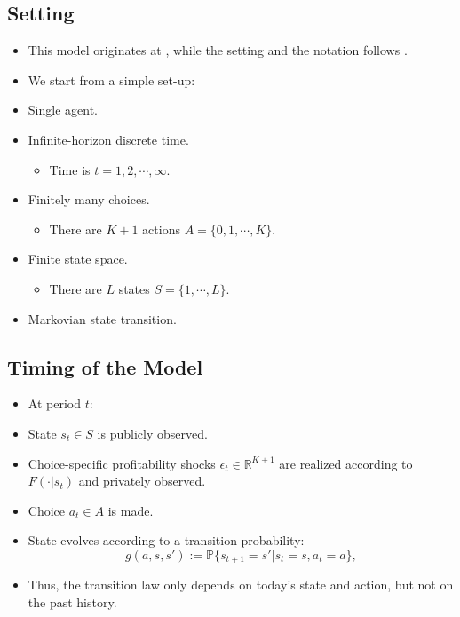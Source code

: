 \documentclass[
]{book}
\providecommand{\tightlist}{%
  \setlength{\itemsep}{0pt}\setlength{\parskip}{0pt}}
\begin{document}
\hypertarget{setting}{%
\subsection{Setting}\label{setting}}

\begin{itemize}
\tightlist
\item
  This model originates at \citet{rustOptimalReplacementGMC1987}, while the setting and the notation follows \citet{pesendorferAsymptoticLeastSquares2008}.
\item
  We start from a simple set-up:
\item
  Single agent.
\item
  Infinite-horizon discrete time.

  \begin{itemize}
  \tightlist
  \item
    Time is \(t = 1, 2, \cdots, \infty\).
  \end{itemize}
\item
  Finitely many choices.

  \begin{itemize}
  \tightlist
  \item
    There are \(K + 1\) actions \(A = \{0, 1, \cdots, K\}\).
  \end{itemize}
\item
  Finite state space.

  \begin{itemize}
  \tightlist
  \item
    There are \(L\) states \(S = \{1, \cdots, L\}\).
  \end{itemize}
\item
  Markovian state transition.
\end{itemize}

\hypertarget{timing-of-the-model}{%
\subsection{Timing of the Model}\label{timing-of-the-model}}

\begin{itemize}
\tightlist
\item
  At period \(t\):
\item
  State \(s_t \in S\) is publicly observed.
\item
  Choice-specific profitability shocks \(\epsilon_t \in \mathbb{R}^{K + 1}\) are realized according to \(F(\cdot|s_t)\) and privately observed.
\item
  Choice \(a_t \in A\) is made.
\item
  State evolves according to a transition probability:
  \begin{equation}
  g(a, s, s') := \mathbb{P}\{s_{t + 1} = s'|s_t = s, a_t = a\},
  \end{equation}
\item
  Thus, the transition law only depends on today's state and action, but not on the past history.
\end{itemize}
\end{document}

